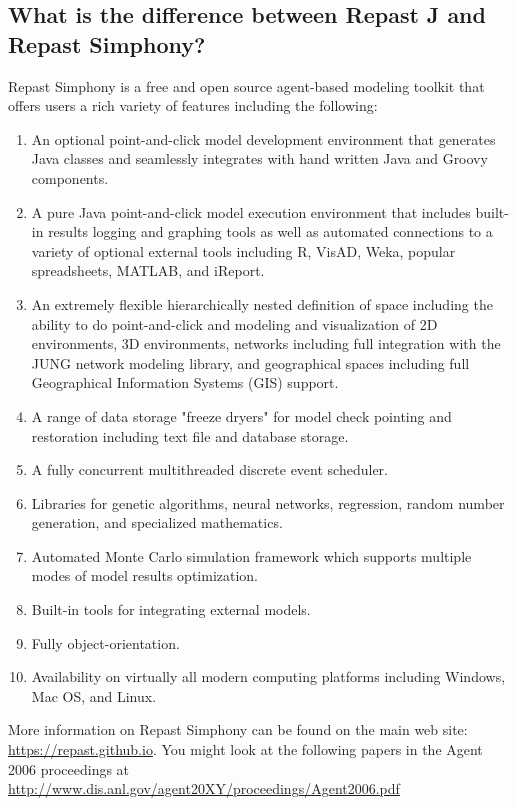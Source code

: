 \documentclass[11pt]{article}
\begin{document}
\subsection{What is the difference between Repast J and Repast Simphony?}
\label{gq:rj_vs_rs}
Repast Simphony is a free and open source agent-based modeling toolkit that offers users a rich variety of features including the following:
\begin{enumerate}
\item An optional point-and-click model development environment that generates Java classes and seamlessly integrates with hand written Java and Groovy components.
\item A pure Java point-and-click model execution environment that includes built-in results logging and graphing tools as well as automated connections to a variety of optional external tools including R, VisAD, Weka, popular spreadsheets, MATLAB, and iReport.
\item An extremely flexible hierarchically nested definition of space including the ability to do point-and-click and modeling and visualization of 2D environments, 3D environments, networks including full integration with the JUNG network modeling library, and geographical spaces including full Geographical Information Systems (GIS) support.
\item A range of data storage "freeze dryers" for model check pointing and restoration including text file and database storage.
\item A fully concurrent multithreaded discrete event scheduler. 
\item Libraries for genetic algorithms, neural networks, regression, random number generation, and
specialized mathematics.
\item Automated Monte Carlo simulation framework which supports multiple modes of model results
optimization. 
\item Built-in tools for integrating external models. 
\item Fully object-orientation.
\item Availability on virtually all modern computing platforms including Windows, Mac OS, and Linux.
\end{enumerate}

More information on Repast Simphony can be found on the main web site:  \url{https://repast.github.io}.
You might look at the following papers in the Agent 2006 proceedings at \url{http://www.dis.anl.gov/agent20XY/proceedings/Agent2006.pdf}
\end{document}

